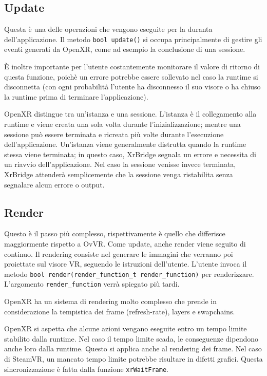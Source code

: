 \documentclass[twoside]{supsistudent}
\begin{document}
\subsection{Update}

Questa è una delle operazioni che vengono eseguite per la duranta dell'applicazione. Il metodo \texttt{bool update()} si occupa principalmente di gestire gli eventi generati da OpenXR, come ad esempio la conclusione di una sessione.

È inoltre importante per l'utente costantemente monitorare il valore di ritorno di questa funzione, poichè un errore potrebbe essere sollevato nel caso la runtime si disconnetta (con ogni probabilità l'utente ha disconnesso il suo visore o ha chiuso la runtime prima di terminare l'applicazione).

OpenXR distingue tra un'istanza e una sessione. L'istanza è il collegamento alla runtime e viene creata una sola volta durante l'inizializzazione; mentre una sessione può essere terminata e ricreata più volte durante l'esecuzione dell'applicazione. Un'istanza viene generalmente distrutta quando la runtime stessa viene terminata; in questo caso, XrBridge segnala un errore e necessita di un riavvio dell'applicazione. Nel caso la sessione venisse invece terminata, XrBridge attenderà semplicemente che la sessione venga ristabilita senza segnalare alcun errore o output.

\subsection{Render}

Questo è il passo più complesso, rispettivamente è quello che differisce maggiormente rispetto a OvVR. Come update, anche render viene seguito di continuo. Il rendering consiste nel generare le immagini che verranno poi proiettate sul visore VR, seguendo le istruzioni dell'utente. L'utente invoca il metodo \texttt{bool render(render\_function\_t render\_function)} per renderizzare. L'argomento \texttt{render\_function} verrà spiegato più tardi.

OpenXR ha un sistema di rendering molto complesso che prende in considerazione la tempistica dei frame (refresh-rate), layers e swapchains.

OpenXR si aspetta che alcune azioni vengano eseguite entro un tempo limite stabilito dalla runtime. Nel caso il tempo limite scada, le conseguenze dipendono anche loro dalla runtime. Questo si applica anche al rendering dei frame. Nel caso di SteamVR, un mancato tempo limite potrebbe risultare in difetti grafici. Questa sincronizzazione è fatta dalla funzione \texttt{xrWaitFrame}.
\end{document}
